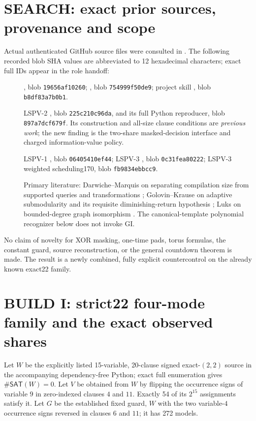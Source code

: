 \documentclass[11pt]{article}
\newcommand{\SAT}{\mathsf{SAT}}
\begin{document}
\section{SEARCH: exact prior sources, provenance and scope}
Actual authenticated GitHub source files were consulted in . The following recorded blob SHA values are abbreviated to 12 hexadecimal characters; exact full IDs appear in the role handoff:
\begin{description}
\item[] , blob \texttt{19656af10260}; , blob \texttt{754999f50de9}; project skill , blob \texttt{b8df83a7b0b1}.
\item[] LSPV-2 , blob \texttt{225c210c96da}, and its full Python reproducer, blob \texttt{897a7dcf679f}. Its construction and all-size clause conditions are \emph{previous work}; the new finding is the two-share masked-decision interface and charged information-value policy.
\item[] LSPV-1 , blob \texttt{06405410ef44}; LSPV-3 , blob \texttt{0c31fea80222}; LSPV-3 weighted scheduling170, blob \texttt{fb9834ebbcc9}.
\item[] Primary literature: Darwiche--Marquis on separating compilation size from supported queries and transformations \cite{darwiche}; Golovin--Krause on adaptive submodularity and its requisite diminishing-return hypothesis \cite{golovin}; Luks on bounded-degree graph isomorphism \cite{luks}. The canonical-template polynomial recognizer below does not invoke GI.
\end{description}
No claim of novelty for XOR masking, one-time pads, torus formulas, the constant guard, source reconstruction, or the general countdown theorem is made. The result is a newly combined, fully explicit countercontrol on the already known exact22 family.

\section{BUILD I: strict22 four-mode family and the exact observed shares}
Let $W$ be the explicitly listed 15-variable, 20-clause signed exact-$(2,2)$ source in the accompanying dependency-free Python; exact full enumeration gives $\#\SAT(W)=0$. Let $V$ be obtained from $W$ by flipping the occurrence signs of variable $9$ in zero-indexed clauses $4$ and $11$. Exactly 54 of its $2^{15}$ assignments satisfy it. Let $G$ be the established fixed guard, $W$ with the two variable-$4$ occurrence signs reversed in clauses $6$ and $11$; it has 272 models.
\end{document}
